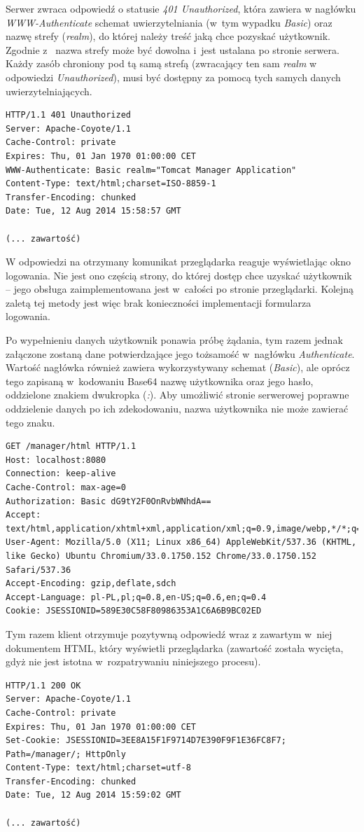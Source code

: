 \documentclass[11pt]{aghdpl}
\begin{document}
Serwer zwraca odpowiedź o statusie \emph{401 Unauthorized}, która zawiera w nagłówku \emph{WWW-Authenticate} schemat uwierzytelniania (w~tym wypadku \emph{Basic}) oraz nazwę strefy (\emph{realm}), do której należy treść jaką chce pozyskać użytkownik. Zgodnie z~\cite{BDA99} nazwa strefy może być dowolna i~jest ustalana po stronie serwera. Każdy zasób chroniony pod tą samą strefą (zwracający ten sam \emph{realm} w odpowiedzi \emph{Unauthorized}), musi być dostępny za pomocą tych samych danych uwierzytelniających.
\begin{lstlisting}
HTTP/1.1 401 Unauthorized
Server: Apache-Coyote/1.1
Cache-Control: private
Expires: Thu, 01 Jan 1970 01:00:00 CET
WWW-Authenticate: Basic realm="Tomcat Manager Application"
Content-Type: text/html;charset=ISO-8859-1
Transfer-Encoding: chunked
Date: Tue, 12 Aug 2014 15:58:57 GMT

(... zawartość)
\end{lstlisting}

W odpowiedzi na otrzymany komunikat przeglądarka reaguje wyświetlając okno logowania. Nie jest ono częścią strony, do której dostęp chce uzyskać użytkownik -- jego obsługa zaimplementowana jest w~całości po stronie przeglądarki. Kolejną zaletą tej metody jest więc brak konieczności implementacji formularza logowania.

Po wypełnieniu danych użytkownik ponawia próbę żądania, tym razem jednak załączone zostaną dane potwierdzające jego tożsamość w~nagłówku \emph{Authenticate}. Wartość nagłówka również zawiera wykorzystywany schemat (\emph{Basic}), ale oprócz tego zapisaną w~kodowaniu Base64 nazwę użytkownika oraz jego hasło, oddzielone znakiem dwukropka (\emph{:}). Aby umożliwić stronie serwerowej poprawne oddzielenie danych po ich zdekodowaniu, nazwa użytkownika nie może zawierać tego znaku.
\begin{lstlisting}
GET /manager/html HTTP/1.1
Host: localhost:8080
Connection: keep-alive
Cache-Control: max-age=0
Authorization: Basic dG9tY2F0OnRvbWNhdA==
Accept: text/html,application/xhtml+xml,application/xml;q=0.9,image/webp,*/*;q=0.8
User-Agent: Mozilla/5.0 (X11; Linux x86_64) AppleWebKit/537.36 (KHTML, like Gecko) Ubuntu Chromium/33.0.1750.152 Chrome/33.0.1750.152 Safari/537.36
Accept-Encoding: gzip,deflate,sdch
Accept-Language: pl-PL,pl;q=0.8,en-US;q=0.6,en;q=0.4
Cookie: JSESSIONID=589E30C58F80986353A1C6A6B9BC02ED
\end{lstlisting}

Tym razem klient otrzymuje pozytywną odpowiedź wraz z zawartym w~niej dokumentem HTML, który wyświetli przeglądarka (zawartość została wycięta, gdyż nie jest istotna w~rozpatrywaniu niniejszego procesu).
\begin{lstlisting}
HTTP/1.1 200 OK
Server: Apache-Coyote/1.1
Cache-Control: private
Expires: Thu, 01 Jan 1970 01:00:00 CET
Set-Cookie: JSESSIONID=3EE8A15F1F9714D7E390F9F1E36FC8F7; Path=/manager/; HttpOnly
Content-Type: text/html;charset=utf-8
Transfer-Encoding: chunked
Date: Tue, 12 Aug 2014 15:59:02 GMT

(... zawartość)
\end{lstlisting}
\end{document}
